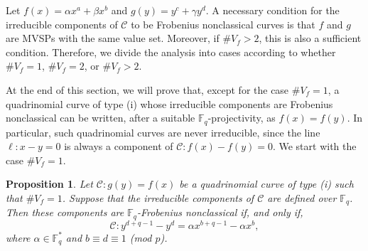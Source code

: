 \documentclass[preprint,12pt]{elsarticle}
\newtheorem{proposition}[theorem]{Proposition}
\begin{document}
Let $f(x) = \alpha x^a + \beta x^b$ and $g(y) = y^c + \gamma y^d$. A necessary condition for the irreducible components of $\mathcal{C}$ to be Frobenius nonclassical curves is that $f$ and $g$ are MVSPs with the same value set. Moreover, if $\# V_f > 2$, this is also a sufficient condition. Therefore, we divide the analysis into cases according to whether $\# V_f = 1$, $\# V_f = 2$, or $\# V_f > 2$. 

At the end of this section, we will prove that, except for the case $\# V_f = 1$, a quadrinomial curve of type (i) whose irreducible components are Frobenius nonclassical can be written, after a suitable $\mathbb{F}_q$-projectivity, as $f(x) = f(y)$. In particular, such quadrinomial curves are never irreducible, since the line $\ell: x - y = 0$ is always a component of $\mathcal{C}: f(x) - f(y) = 0$. We start with the case $\# V_f = 1$.

\begin{proposition}
Let $\mathcal{C}: g(y) = f(x)$ be a quadrinomial curve of type (i) such that $\# V_f = 1$. Suppose that the irreducible components of $\mathcal{C}$ are defined over $\mathbb{F}_q$. Then these components are $\mathbb{F}_q$-Frobenius nonclassical if, and only if, 
$$
\mathcal{C}: y^{d + q - 1} - y^d = \alpha x^{b + q - 1} - \alpha x^b,
$$
where $\alpha \in \mathbb{F}_q^*$ and $b \equiv d \equiv 1$ (mod $p$).
\end{proposition}
\end{document}
